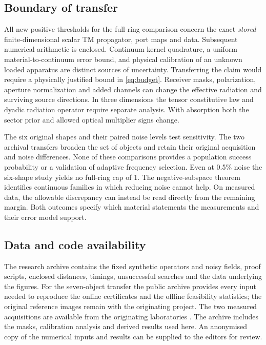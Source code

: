 \documentclass[anonymous,12pt]{iopjournal}
\theoremstyle{remark}\newtheorem{remark}[theorem]{Remark}
\numberwithin{equation}{section}
\begin{document}
\subsection{Boundary of transfer}
All new positive thresholds for the full-ring comparison concern the exact \emph{stored} finite-dimensional scalar TM propagator, port maps and data. Subsequent numerical arithmetic is enclosed. Continuum kernel quadrature, a uniform material-to-continuum error bound, and physical calibration of an unknown loaded apparatus are distinct sources of uncertainty. Transferring the claim would require a physically justified bound in \eqref{eq:budget}. Receiver masks, polarization, aperture normalization and added channels can change the effective radiation and surviving source directions. In three dimensions the tensor constitutive law and dyadic radiation operator require separate analysis. With absorption both the sector prior and allowed optical multiplier signs change.

The six original shapes and their paired noise levels test sensitivity. The two archival transfers broaden the set of objects and retain their original acquisition and noise differences. None of these comparisons provides a population success probability or a validation of adaptive frequency selection. Even at 0.5\% noise the six-shape study yields no full-ring cap of 1. The negative-subspace theorem identifies continuous families in which reducing noise cannot help. On measured data, the allowable discrepancy can instead be read directly from the remaining margin. Both outcomes specify which material statements the measurements and their error model support.

\subsection*{Data and code availability}
The research archive contains the fixed synthetic operators and noisy fields, proof scripts, enclosed distances, timings, unsuccessful searches and the data underlying the figures. For the seven-object transfer the public archive provides every input needed to reproduce the online certificates and the offline feasibility statistics; the original reference images remain with the originating project. The two measured acquisitions are available from the originating laboratories \cite{fresnel,manitoba}. The archive includes the masks, calibration analysis and derived results used here. An anonymised copy of the numerical inputs and results can be supplied to the editors for review.
\end{document}
